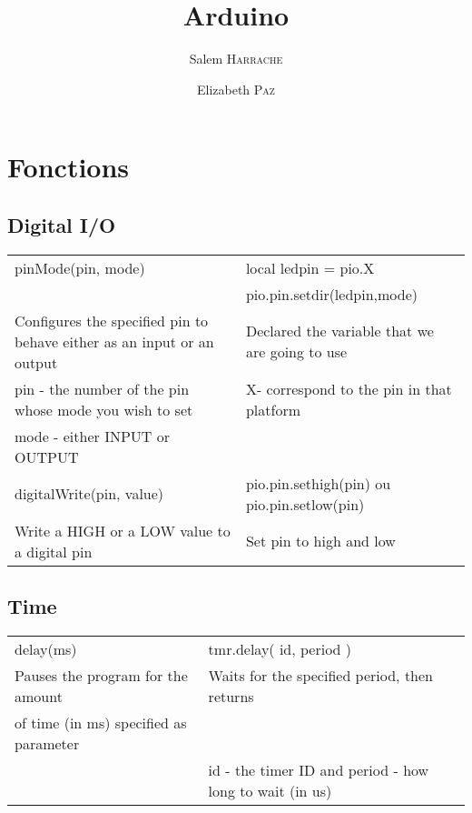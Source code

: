 \documentclass[a4paper,10pt]{article}
\title{Arduino}
\author{Salem \textsc{Harrache} \and Elizabeth \textsc{Paz}}
\date{}
\begin{document}
\maketitle
\section{Fonctions}

\subsection{Digital I/O}

\begin{tabular}{|l|l|}
\hline
pinMode(pin, mode) & local ledpin = pio.X \\
 & pio.pin.setdir(ledpin,mode) \\ \hline \hline
Configures the specified pin to behave either as an input or an output & Declared the variable that we are going to use \\
pin - the number of the pin whose mode you wish to set & X- correspond to the pin in that platform \\
mode - either INPUT or OUTPUT & \\ \hline

digitalWrite(pin, value) & pio.pin.sethigh(pin) ou pio.pin.setlow(pin) \\
Write a HIGH or a LOW value to a digital pin  & Set pin to high and low \\ \hline

\hline \end{tabular}

\subsection{Time}

\begin{tabular}{|l|l|} \hline
delay(ms) & tmr.delay( id, period )\\
Pauses the program for the amount  & Waits for the specified period, then returns \\ 
of time (in ms) specified as parameter & \\
&  id - the timer ID and period - how long to wait (in us)\\
\hline \end{tabular}
\end{document}

